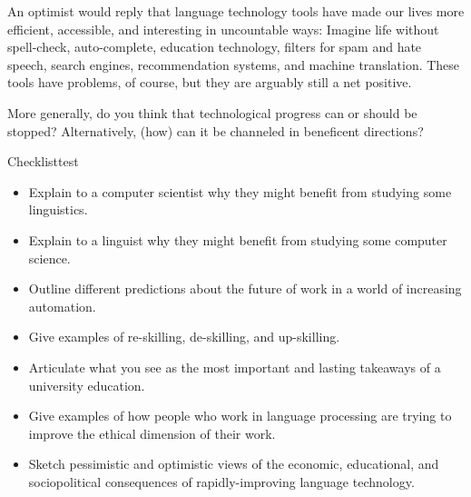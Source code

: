 An optimist would reply that language technology tools have made our lives more efficient, accessible, and interesting in uncountable ways: Imagine life without spell-check, auto-complete, education technology,  filters for spam and hate speech, search engines, recommendation systems, and machine translation.  These tools have problems, of course, but they are arguably still a net positive. 

More generally, do you think that technological progress can or should be stopped?  Alternatively, (how) can it be channeled in beneficent directions?





\begin{tblsfilledsymbol}{Checklist}{test}

% 

\begin{itemize}
\item Explain to a computer scientist why they might benefit from studying some linguistics.
\item Explain to a linguist why they might benefit from studying some computer science.
\item Outline different predictions about the future of work in a world of increasing automation.
\item Give examples of re-skilling, de-skilling, and up-skilling.
\item Articulate what you see as the most important and lasting takeaways of a university education.
\item Give examples of how people who work in language processing are trying to improve the ethical dimension of their work.
\item Sketch pessimistic and optimistic views of the economic, educational, and sociopolitical consequences of rapidly-improving language technology.

% 

\end{itemize}
\end{tblsfilledsymbol}



